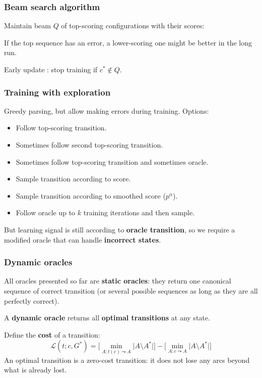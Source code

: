 \documentclass[t]{beamer}
\begin{document}
\begin{frame}
  \frametitle{Beam search algorithm}
    Maintain beam $Q$ of top-scoring configurations with their scores:
    
    \begin{algorithmic}[0]
    \ENDWHILE
    \end{algorithmic}
    
    \pause\vfill
    
    If the top sequence has an error, a lower-scoring one might be better in the long run.
    
    \pause\vfill
    
    Early update \cite{Coll:04}: stop training if $c^* \not\in Q$.
\end{frame}

\begin{frame}
  \frametitle{Training with exploration \cite{goldberg2013training}}
  Greedy parsing, but allow making errors during training. Options:
  
  \begin{itemize}
  \item Follow top-scoring transition.
  \item Sometimes follow second top-scoring transition.
  \item Sometimes follow top-scoring transition and sometimes oracle.
  \item Sample transition according to score.
  \item Sample transition according to smoothed score ($p^\alpha$).
  \item Follow oracle up to $k$ training iterations and then sample.
  \end{itemize}
  
  \pause\vfill
  
  But learning signal is still according to \textbf{oracle transition}, so
  we require a modified oracle that can handle \textbf{incorrect states}.
\end{frame}

\begin{frame}
  \frametitle{Dynamic oracles \cite{goldberg2012dynamic}}
  All oracles presented so far are \textbf{static oracles}:
  they return one canonical sequence of correct transition
  (or several possible sequences as long as they are all perfectly correct).
  
  A \textbf{dynamic oracle} returns all \textbf{optimal transitions} at any state.
  
  \pause\vfill
  
  Define the \textbf{cost} of a transition:
  \[
  \mathcal{L}(t;c,G^*)=\Bigg[\min_{A:t(c)\leadsto A} \Big|A\setminus A^*\Big|\Bigg]-
  \Bigg[\min_{A:c\leadsto A} \Big|A\setminus A^*\Big|\Bigg]
  \]
  An optimal transition is a zero-cost transition:
  it does not lose any arcs beyond what is already lost.
\end{frame}
\end{document}
